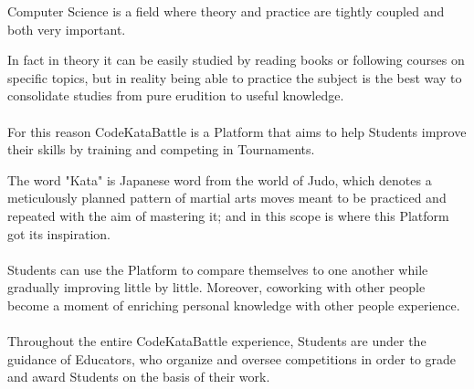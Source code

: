 \setlength{\leftmargini}{5em} %
Computer Science is a field where theory and practice are tightly coupled and both very important. 

In fact in theory it can be easily studied by reading books or following courses on specific topics, but in reality being able to practice the subject is the best way to consolidate studies from pure erudition to useful knowledge.\\
\\
For this reason CodeKataBattle is a Platform that aims to help Students improve their skills by training and competing in Tournaments.

The word "Kata" is Japanese word from the world of Judo, which denotes a meticulously planned pattern of martial arts moves meant to be practiced and repeated with the aim of mastering it; and in this scope is where this Platform got its inspiration.\\ 
\\
Students can use the Platform to compare themselves to one another while gradually improving little by little. Moreover, coworking with other people become a moment of enriching personal knowledge with other people experience.\\
\\
Throughout the entire CodeKataBattle experience, Students are under the guidance of Educators, who organize and oversee competitions in order to grade and award Students on the basis of their work.

